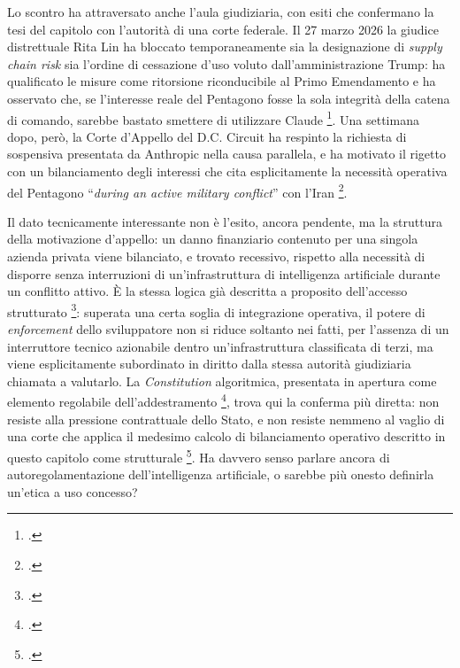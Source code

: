 \ifstampa\documentclass[a4paper,12pt,twoside,openright]{report}\else\documentclass[a4paper,12pt]{report}\fi
\newif\ifrevisione \revisionefalse
\DeclareRobustCommand{\rev}[1]{\ifrevisione{\color{blue!65!black}#1}\else#1\fi}
\begin{document}
Lo scontro ha attraversato anche l'aula giudiziaria, con esiti che confermano la
tesi del capitolo con l'autorità di una corte federale. Il 27 marzo 2026 la
giudice distrettuale Rita Lin ha bloccato temporaneamente sia la designazione di
\textit{supply chain risk} sia l'ordine di cessazione d'uso voluto
dall'amministrazione Trump: ha qualificato le misure come ritorsione riconducibile
al Primo Emendamento e ha osservato che, se l'interesse reale del Pentagono fosse
la sola integrità della catena di comando, sarebbe bastato smettere di utilizzare
Claude \footcite{thehill_2026_lin}. Una settimana dopo, però, la Corte d'Appello
del D.C. Circuit ha respinto la richiesta di sospensiva presentata da Anthropic
nella causa parallela, e ha motivato il rigetto con un bilanciamento degli
interessi che cita esplicitamente la necessità operativa del Pentagono
``\textit{during an active military conflict}'' con l'Iran
\footcite{thehill_2026_appello}.

Il dato tecnicamente interessante non è l'esito, ancora pendente, ma la struttura
della motivazione d'appello: un danno finanziario contenuto per una singola
azienda privata viene bilanciato, e trovato recessivo, rispetto alla necessità di
disporre senza interruzioni di un'infrastruttura di intelligenza artificiale
durante un conflitto attivo. È la stessa logica già descritta a proposito
dell'accesso strutturato \footcite{shevlane_2022_access}: superata una certa
soglia di integrazione operativa, il potere di \textit{enforcement} \rev{dello sviluppatore}
non si riduce soltanto nei fatti, per l'assenza di un interruttore tecnico
azionabile dentro un'infrastruttura classificata di terzi, ma viene esplicitamente
subordinato in diritto dalla stessa autorità giudiziaria chiamata a valutarlo. La
\textit{Constitution} algoritmica, presentata in apertura come \rev{elemento regolabile
dell'addestramento} \footcite{bai_2022_cai}, trova qui la conferma più
diretta: non resiste alla pressione contrattuale dello Stato, e non resiste
nemmeno al vaglio di una corte che applica il medesimo calcolo di bilanciamento
operativo descritto in questo capitolo come strutturale
\footcite{leggezero_anthropic_2026}. Ha davvero senso parlare ancora di
autoregolamentazione dell'intelligenza artificiale, o sarebbe più onesto definirla
un'etica a uso concesso?
\end{document}
